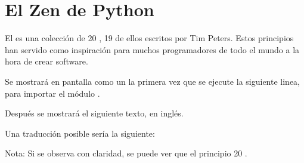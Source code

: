 \section{El Zen de Python}

El  es una colección de 20 , 19 de ellos escritos por Tim Peters. Estos principios han servido como inspiración para muchos programadores de todo el mundo a la hora de crear software.\smallskip

Se mostrará en pantalla como un  la primera vez que se ejecute la siguiente linea, para importar el módulo .


Después se mostrará el siguiente texto, en inglés.


Una traducción posible sería la siguiente:


Nota: Si se observa con claridad, se puede ver que el principio 20 .

\clearpage